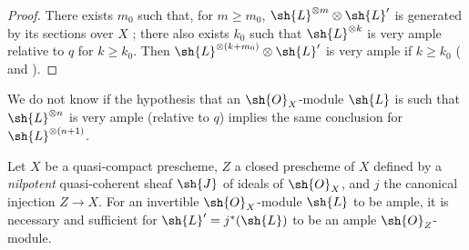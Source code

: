\begin{proof}
There exists $m_0$ such that, for $m\geq m_0$, $\sh{L}^{\otimes m}\otimes\sh{L}'$ is generated by its sections over $X$ ;
there also exists $k_0$ such that $\sh{L}^{\otimes k}$ is very ample relative to $q$ for $k\geq k_0$.
Then $\sh{L}^{\otimes(k+m_0)}\otimes\sh{L}'$ is very ample if $k\geq k_0$ ( and ).
\end{proof}

\begin{remark}[4.5.12]
\label{II.4.5.12}
We do not know if the hypothesis that an $\sh{O}_X$-module $\sh{L}$ is such that $\sh{L}^{\otimes n}$ is very ample (relative to $q$) implies the same conclusion for $\sh{L}^{\otimes(n+1)}$.
\end{remark}

\begin{proposition}[4.5.13]
\label{II.4.5.13}
Let $X$ be a quasi-compact prescheme, $Z$ a closed prescheme of $X$ defined by a \emph{nilpotent} quasi-coherent sheaf $\sh{J}$ of ideals of $\sh{O}_X$, and $j$ the canonical injection $Z\to X$.
For an invertible $\sh{O}_X$-module $\sh{L}$ to be ample, it is necessary and sufficient for $\sh{L}'=j^*(\sh{L})$ to be an ample $\sh{O}_Z$-module.
\end{proposition}

